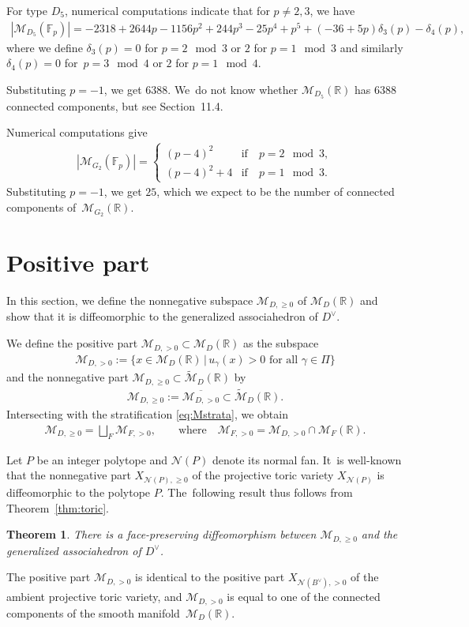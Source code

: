 \documentclass[pdftex]{sigma}%
\def\R{{\mathbb R}}
\def\F{{\mathbb F}}
\def\M{{\mathcal{M}}}
\def\tM{{\widetilde {\mathcal{M}}}}
\def\N{{\mathcal{N}}}
\numberwithin{equation}{section}
\newtheorem{Theorem}{Theorem}[section]
\begin{document}
For type $D_5$, numerical computations indicate that for $p \neq 2,3 $, we have
\begin{gather*}
|\M_{D_5}(\F_p)|=-2318 + 2644 p - 1156 p^2 + 244 p^3 - 25 p^4 + p^5+ (-36+5 p) \delta_3 (p)- \delta_4 (p),
\end{gather*}
where we define $\delta_3 (p)=0$ for $p = 2 \mod 3$ or $2$ for $p = 1 \mod 3$ and similarly $\delta_4 (p)=0$ for~$p=3 \mod 4$ or $2$ for $p=1 \mod 4$.

Substituting $p=-1$, we get $6388$. We~do not know whether $\M_{D_5}(\R)$ has $6388$ connected components, but see Section~11.4.

\bigskip{} %
Numerical computations give
\begin{gather*}
|\M_{G_2}(\F_p)| = \begin{cases}
(p-4)^2 & \mbox{if}\quad p = 2 \mod 3,
\\
(p-4)^2 + 4& \mbox{if}\quad p = 1 \mod 3.
\end{cases}
\end{gather*}
Substituting $p = -1$, we get $25$, which we expect to be the number of connected components of~$\M_{G_2}(\R)$.

\section{Positive part}
In this section, we define the nonnegative subspace $\M_{D,\geq 0}$ of $\M_D(\R)$ and show that it is diffeomorphic to the generalized associahedron of $D^\vee$.

\bigskip{} %
We define the positive part $\M_{D,>0} \subset \M_D(\R)$ as the subspace
\begin{gather*}
\M_{D, >0} := \big\{x \in \M_D(\R) \,|\, u_\gamma(x) > 0 \text{ for all } \gamma \in \Pi\big\}
\end{gather*}
and the nonnegative part $\M_{D,\geq 0} \subset \tM_D(\R)$ by
\begin{gather*}
\M_{D,\geq 0} := \overline{\M_{D,>0}} \subset \tM_D(\R).
\end{gather*}
Intersecting with the stratification \eqref{eq:Mstrata}, we obtain
\begin{gather*}
\M_{D,\geq 0} = \bigsqcup_F \M_{F,>0}, \qquad \text{where} \quad \M_{F,>0} = \M_{D,>0} \cap \M_F(\R).
\end{gather*}

Let $P$ be an integer polytope and $\N(P)$ denote its normal fan. It~is well-known \cite[Chapter~4]{Ful} that the nonnegative part $X_{\N(P),\geq 0}$ of the projective toric variety $X_{\N(P)}$ is diffeomorphic to the polytope $P$. The~following result thus follows from Theorem~\ref{thm:toric}.
\begin{Theorem}\label{thm:pospart}
There is a face-preserving diffeomorphism between $\M_{D,\geq 0}$ and the generalized associahedron of $D^\vee$.
\end{Theorem}
The positive part $\M_{D,>0}$ is identical to the positive part $X_{\N(B^\vee),>0}$ of the ambient projective toric variety, and $\M_{D,>0}$ is equal to one of the connected components of the smooth manifold~$\M_D(\R)$.
\end{document}
